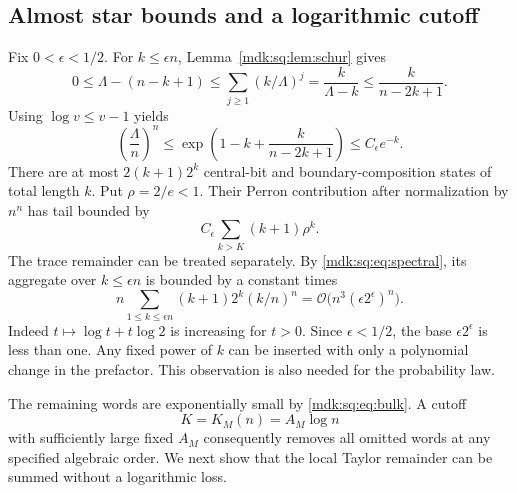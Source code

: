 \documentclass[11pt,letterpaper]{article}
\numberwithin{equation}{section}
\theoremstyle{remark}\newtheorem{remark}[theorem]{Remark}
\newcommand{\Oh}{\mathcal O}\newcommand{\Q}{\mathbb Q}\newcommand{\N}{\mathbb N}\newcommand{\R}{\mathbb R}
\begin{document}
\subsection{Almost star bounds and a logarithmic cutoff}
Fix $0<\epsilon<1/2$. For $k\le\epsilon n$, Lemma~\ref{mdk:sq:lem:schur} gives
\begin{equation}\label{mdk:sq:eq:lambda-tail}
0\le\Lambda-(n-k+1)
\le\sum_{j\ge1}(k/\Lambda)^j
=\frac{k}{\Lambda-k}
\le\frac{k}{n-2k+1}.
\end{equation}
Using $\log v\le v-1$ yields
\begin{equation}\label{mdk:sq:eq:perron-tail}
\left(\frac\Lambda n\right)^n
\le\exp\left(1-k+\frac{k}{n-2k+1}\right)
\le C_\epsilon e^{-k}.
\end{equation}
There are at most $2(k+1)2^k$ central-bit and boundary-composition states of total length $k$. Put $\rho=2/e<1$. Their Perron contribution after normalization by $n^n$ has tail bounded by
\begin{equation}\label{mdk:sq:eq:tail}
C_\epsilon\sum_{k>K}(k+1)\rho^k.
\end{equation}
The trace remainder can be treated separately. By \eqref{mdk:sq:eq:spectral}, its aggregate over $k\le\epsilon n$ is bounded by a constant times
\[
n\sum_{1\le k\le\epsilon n}(k+1)2^k(k/n)^n
=\Oh\bigl(n^3(\epsilon 2^\epsilon)^n\bigr).
\]
Indeed $t\mapsto\log t+t\log2$ is increasing for $t>0$. Since $\epsilon<1/2$, the base $\epsilon2^\epsilon$ is less than one. Any fixed power of $k$ can be inserted with only a polynomial change in the prefactor. This observation is also needed for the probability law.

The remaining words are exponentially small by \eqref{mdk:sq:eq:bulk}. A cutoff
\[
K=K_M(n)=A_M\log n
\]
with sufficiently large fixed $A_M$ consequently removes all omitted words at any specified algebraic order. We next show that the local Taylor remainder can be summed without a logarithmic loss.
\end{document}
